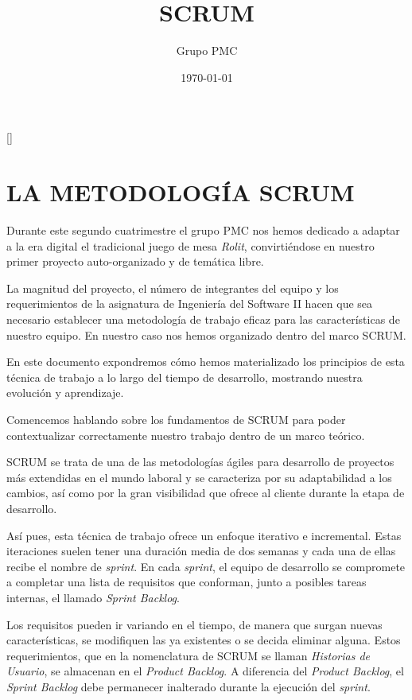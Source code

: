 \documentclass[12pt,a4paper,openright]{book}
\title{\Huge SCRUM}
\date{\today}
\author{Grupo PMC}
\newcommand{\defaultformat}{
	\titleformat{\chapter}[display]{\centering\normalfont\huge\bfseries}{}{0pt}{\Huge ##1}[\titlerule]
    \titleformat{\section}{\normalfont\Large\bfseries}{}{0pt}{##1}
    \titleformat{\subsection}{\normalfont\large\bfseries}{}{0pt}{\uline{##1}}
    \titleformat{\subsubsection}{\normalfont\normalsize\bfseries}{}{0pt}{##1}
}
\begin{document}
\defaultformat
\maketitle
\setcounter{tocdepth}{3}
\setcounter{secnumdepth}{3}
\tableofcontents

\chapter{LA METODOLOGÍA SCRUM}
Durante este segundo cuatrimestre el grupo PMC nos hemos dedicado a adaptar a la era digital el tradicional juego de mesa \textit{Rolit}, convirtiéndose en nuestro primer proyecto auto-organizado y de temática libre.

La magnitud del proyecto, el número de integrantes del equipo y los requerimientos de la asignatura de Ingeniería del Software II hacen que sea necesario establecer una metodología de trabajo eficaz para las características de nuestro equipo. En nuestro caso nos hemos organizado dentro del marco SCRUM.

En este documento expondremos cómo hemos materializado los principios de esta técnica de trabajo a lo largo del tiempo de desarrollo, mostrando nuestra evolución y aprendizaje.

Comencemos hablando sobre los fundamentos de SCRUM para poder contextualizar correctamente nuestro trabajo dentro de un marco teórico.

SCRUM se trata de una de las metodologías ágiles para desarrollo de proyectos más extendidas en el mundo laboral y se caracteriza por su adaptabilidad a los cambios, así como por la gran visibilidad que ofrece al cliente durante la etapa de desarrollo.

Así pues, esta técnica de trabajo ofrece un enfoque iterativo e incremental. Estas iteraciones suelen tener una duración media de dos semanas y cada una de ellas recibe el nombre de \textit{sprint}. En cada \textit{sprint}, el equipo de desarrollo se compromete a completar una lista de requisitos que conforman, junto a posibles tareas internas, el llamado \textit{Sprint Backlog}.

Los requisitos pueden ir variando en el tiempo, de manera que surgan nuevas características, se modifiquen las ya existentes o se decida eliminar alguna. Estos requerimientos, que en la nomenclatura de SCRUM se llaman \textit{Historias de Usuario}, se almacenan en el \textit{Product Backlog}. A diferencia del \textit{Product Backlog}, el \textit{Sprint Backlog} debe permanecer inalterado durante la ejecución del \textit{sprint}.
\end{document}
